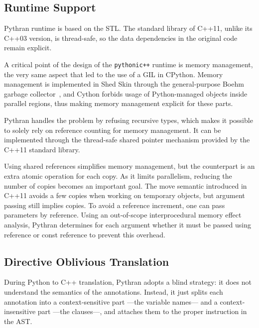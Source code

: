 \documentclass{llncs}
\begin{document}
\subsection{Runtime Support}

Pythran runtime is based on the STL. The standard library of C++11, unlike its
C++03 version, is thread-safe, so the data dependencies in the original code
remain explicit.

A critical point of the design of the \texttt{pythonic++} runtime is memory
management, the very same aspect that led to the use of a GIL in CPython.
Memory management is implemented in Shed Skin through the general-purpose Boehm
garbage collector~\cite{boehm1991}, and Cython forbids usage of Python-managed
objects inside parallel regions, thus making memory management explicit for
these parts.

Pythran handles the problem by refusing recursive types, which makes it possible
to solely rely on reference counting for memory management. It can be
implemented through the thread-safe shared pointer mechanism provided by the C++11
standard library.

Using shared references simplifies memory management, but the counterpart is an
extra atomic operation for each copy. As it limits parallelism, reducing the
number of copies becomes an important goal. The move semantic introduced in
C++11 avoids a few copies when working on temporary objects, but argument
passing still implies copies. To avoid a reference increment, one can pass
parameters by reference. Using an out-of-scope interprocedural memory effect
analysis, Pythran determines for each argument whether it must be passed using
reference or const reference to prevent this overhead.


\subsection{Directive Oblivious Translation}

During Python to C++ translation, Pythran adopts a blind strategy: it does not
understand the semantics of the annotations. Instead, it just splits each
annotation into a context-sensitive part ---the variable names--- and a
context-insensitive part ---the clauses---, and attaches them to the proper
instruction in the AST.
\end{document}
